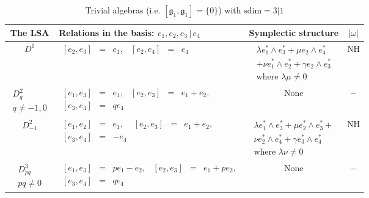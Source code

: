 \documentclass[12pt]{amsart}
\begin{document}
\scriptsize
\begin{table}[H]
\centering
\begin{tabular}{| c | l | c |c|}\hline
 The LSA & Relations in the basis: $e_1, e_2, e_3 \, |\, e_4$ & Symplectic structure & $|\omega|$ \\ \hline
 $D^1$ & $
\begin{array}{lcrlcl}
[e_2, e_3]&=&e_1, & [e_2, e_4]&=&e_4
\end{array}$ & $\begin{array}{l}
\lambda e_1^*\wedge e_3^*+ \mu e_2\wedge e_4^*\\[1mm]
+\nu e_1^*\wedge e_2^*+ \gamma e_2\wedge e_3^*\\[1mm]
\text{where } \lambda \mu \not =0
\end{array}$ & NH\\ \hline
 $\begin{array}{l}
D^2_q\\[1mm]
q \not =-1,0
\end{array}$ & $
\begin{array}{lcrlcl}
[e_1, e_3]&=& e_1, & [e_2, e_3]&=& e_1+ e_2,\\[1mm]
 [e_3, e_4]&=& q e_4
\end{array}$ & None & $-$\\ \hline
 $\begin{array}{l}
D^2_{-1}
\end{array}$ & $
\begin{array}{lcrlcl}
[e_1, e_2]&=& e_1, & [e_2, e_3]&=& e_1+ e_2,\\[1mm]
 [e_3, e_4]&=& - e_4
\end{array}$ & $
\begin{array}{l}
\lambda e_1^*\wedge e_3^*+ \mu e_2^*\wedge e_3^*+\\[2mm]
 \nu e_2^*\wedge e_4^*+ \gamma e_3^*\wedge e_4^*\\[2mm]
\text{where } \lambda \nu \not =0
\end{array}$ & NH\\ \hline
 $\begin{array}{l}
D^3_{pq}\\[1mm]
pq\not =0
\end{array}$ & $
\begin{array}{lcllcl}
[e_1, e_3]&=& pe_1-e_2, & [e_2, e_3]&=& e_1+ pe_2,\\[1mm]
 [e_3, e_4]&=&q e_4
\end{array}$ & None & $-$\\ \hline
\end{tabular}
\caption{Trivial algebras (i.e. $[\mathfrak{g}_{\bar 1}, \mathfrak{g}_{\bar 1}]=\{0\}$) with $\mathrm{sdim}=3|1$}\label{tab3}
\end{table}
\end{document}
